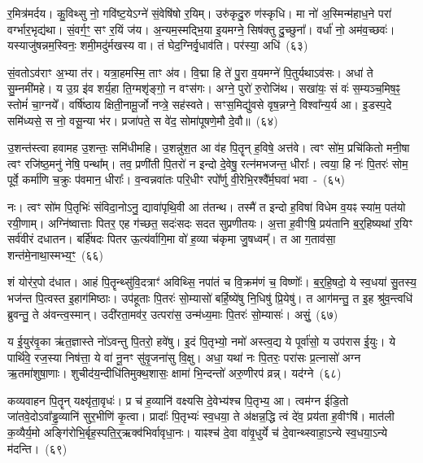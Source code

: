 र॒मित्र॑मर्दय। कु॒विथ्सु नो॒ गवि॑ष्ट॒ये\-ऽग्ने॑ सं॒वेषि॑षो र॒यिम्। उरु॑कृदु॒रु ण॑स्कृधि। मा नो॑ अ॒स्मिन्म॑हाध॒ने परा॑ वर्ग्भार॒भृद्य॑था। सं॒वर्ग॒ꣳ॒ सꣳ र॒यिं ज॑य। अ॒न्यम॒स्मद्भि॒या इ॒यमग्ने॒ सिष॑क्तु दु॒च्छुना᳚। वर्धा॑ नो॒ अम॑व॒च्छवः॑। यस्याजु॑षन्नम॒स्विनः॒ शमी॒मदु॑र्मखस्य वा। तं घेद॒ग्निर्वृ॒धाव॑ति। पर॑स्या॒ अधि॑~(६३)\ip

सं॒वतो\-ऽव॑राꣳ अ॒भ्या त॑र। यत्रा॒हमस्मि॒ ताꣳ अ॑व। वि॒द्मा हि ते॑ पु॒रा व॒यमग्ने॑ पि॒तुर्यथाऽव॑सः। अधा॑ ते सु॒म्नमी॑महे। य उ॒ग्र इ॑व शर्य॒हा ति॒ग्मशृ॑ङ्गो॒ न वꣳस॑गः। अग्ने॒ पुरो॑ रु॒रोजि॑थ। सखा॑यः॒ सं वः॑ स॒म्यञ्च॒मिष॒ꣴ॒ स्तोमं॑ चा॒ग्नये᳚। वर्\mbox{}षि॑ष्ठाय क्षिती॒नामू॒र्जो नप्त्रे॒ सह॑\-स्वते। सꣳस॒मिद्यु॑वसे वृष॒न्नग्ने॒ विश्वा᳚न्य॒र्य आ। इ॒डस्प॒दे समि॑ध्यसे॒ स नो॒ वसू॒न्या भ॑र। प्रजा॑पते॒ स वे॑द॒ सोमा॑पूषणे॒मौ दे॒वौ॥~(६४)\ip

{\anuvakamend[{य॒ज्ञममै॒रधि॑ वृष॒न्नेका॒न्नविꣳ॑श॒तिश्च॑}]}%

उ॒शन्त॑स्त्वा हवामह उ॒शन्तः॒ समि॑धीमहि। उ॒शन्नु॑श॒त आ व॑ह पि॒तॄन् ह॒विषे॒ अत्त॑वे। त्वꣳ सो॑म॒ प्रचि॑कितो मनी॒षा त्वꣳ रजि॑ष्ठ॒मनु॑ नेषि॒ पन्था᳚म्। तव॒ प्रणी॑ती पि॒तरो॑ न इन्दो दे॒वेषु॒ रत्न॑मभजन्त॒ धीराः᳚। त्वया॒ हि नः॑ पि॒तरः॑ सोम॒ पूर्वे॒ कर्मा॑णि च॒क्रुः प॑वमान॒ धीराः᳚। व॒न्वन्नवा॑तः परि॒धीꣳ रपो᳚र्णु वी॒रेभि॒रश्वै᳚र्म॒घवा॑ भवा~-~(६५)\ip

नः। त्वꣳ सो॑म पि॒तृभिः॑ संविदा॒नो\-ऽनु॒ द्यावा॑\-पृथि॒वी आ त॑तन्थ। तस्मै॑ त इन्दो ह॒विषा॑ विधेम व॒यꣴ स्या॑म॒ पत॑यो रयी॒णाम्। अग्नि॑ष्वात्ताः पितर॒ एह ग॑च्छत॒ सदः॑सदः सदत सुप्रणीतयः। अ॒त्ता ह॒वीꣳषि॒ प्रय॑तानि ब॒र्॒\mbox{}हिष्यथा॑ र॒यिꣳ सर्व॑वीरं दधातन। बर्\mbox{}हि॑षदः पितर ऊ॒त्य॑र्वागि॒मा वो॑ ह॒व्या च॑कृमा जु॒षध्वम्᳚। त आ ग॒ताव॑सा॒ शन्त॑मे॒नाथा॒स्मभ्य॒ꣳ॒~(६६)\ip

शं योर॑र॒पो द॑धात। आहं पि॒तॄन्थ्सु॑वि॒दत्राꣳ॑ अविथ्सि॒ नपा॑तं च वि॒क्रम॑णं च॒ विष्णोः᳚। ब॒र्॒\mbox{}हि॒षदो॒ ये स्व॒धया॑ सु॒तस्य॒ भज॑न्त पि॒त्वस्त इ॒हाग॑मिष्ठाः। उप॑हूताः पि॒तरः॑ सो॒म्यासो॑ बर्\mbox{}हि॒ष्ये॑षु नि॒धिषु॑ प्रि॒येषु॑। त आग॑मन्तु॒ त इ॒ह श्रु॑व॒न्त्वधि॑ ब्रुवन्तु॒ ते अ॑वन्त्व॒स्मान्। उदी॑रता॒मव॑र॒ उत्परा॑स॒ उन्म॑ध्य॒माः पि॒तरः॑ सो॒म्यासः॑। असुं॒~(६७)\ip

य ई॒युर॑वृ॒का ऋ॑त॒ज्ञास्ते नो॑\-ऽवन्तु पि॒तरो॒ हवे॑षु। इ॒दं पि॒तृभ्यो॒ नमो॑ अस्त्व॒द्य ये पूर्वा॑सो॒ य उप॑रास ई॒युः। ये पार्थि॑वे॒ रज॒स्या निष॑त्ता॒ ये वा॑ नू॒नꣳ सु॑वृ॒जना॑सु वि॒क्षु। अधा॒ यथा॑ नः पि॒तरः॒ परा॑सः प्र॒त्नासो॑ अग्न ऋ॒तमा॑शुषा॒णाः। शुचीद॑य॒न्दीधि॑तिमुक्थ॒शासः॒ क्षामा॑ भि॒न्दन्तो॑ अरु॒णीरप॑ व्रन्न्। यद॑ग्ने~(६८)\ip

कव्यवाहन पि॒तॄन् यक्ष्यृ॑ता॒वृधः॑। प्र च॑ ह॒व्यानि॑ वक्ष्यसि दे॒वेभ्य॑श्च पि॒तृभ्य॒ आ। त्वम॑ग्न ईडि॒तो जा॑तवे॒दो\-ऽवा᳚ड्ढ॒व्यानि॑ सुर॒भीणि॑ कृ॒त्वा। प्रादाः᳚ पि॒तृभ्यः॑ स्व॒धया॒ ते अ॑क्षन्न॒द्धि त्वं दे॑व॒ प्रय॑ता ह॒वीꣳषि॑। मात॑ली क॒व्यैर्य॒मो अङ्गि॑रोभि॒र्बृह॒स्पति॒र्॒\mbox{}ऋक्व॑भिर्वावृधा॒नः। याꣴश्च॑ दे॒वा वा॑वृ॒धुर्ये च॑ दे॒वान्थ्\-स्वाहा॒\-ऽन्ये स्व॒धया॒\-ऽन्ये म॑दन्ति।~(६९)\ip

